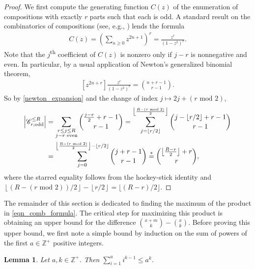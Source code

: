 \documentclass[11pt]{amsart}
\newtheorem{lemma}[theorem]{Lemma}
\newcommand{\ZZ}{\mathbb{Z}}
\begin{document}
\begin{proof}
    We first compute the generating function $C(z)$ of the enumeration of compositions with exactly $r$ parts such that each is odd. A standard result on the combinatorics of compositions (see, e.g., \cite[Theorem 2.1]{GF_of_restricted_comps}) lends the formula
    \begin{align*}
        C(z)=\left(\sum_{n\geq0}z^{2n+1}\right)^r=\frac{z^r}{\left(1-z^2\right)^r}.
    \end{align*}
    Note that the $j$\textsuperscript{th} coefficient of $C(z)$ is nonzero only if $j-r$ is nonnegative and even. In particular, by a usual application of Newton's generalized binomial theorem,
    \begin{align}\label{newton_expansion}
        [z^{2n+r}]\frac{z^r}{\left(1-z^2\right)^r}={n+r-1\choose r-1}.
    \end{align}
    So by \eqref{newton_expansion} and the change of index $j\mapsto 2j+(r\text{~mod~} 2)$,
    \begin{align*}
        \left|\mathscr{C}_{r,\text{\normalfont odd}}^{\leq R}\right|&=\sum_{\substack{r\leq j\leq R\\ j-r\text{~even}}}{\frac{j-r}{2}+r-1\choose r-1}=\sum_{j=\lfloor r/2\rfloor}^{\left\lfloor\frac{R-(r\text{~mod~}2)}{2}\right\rfloor}{j-\lfloor r/2\rfloor+r-1\choose r-1}\\
        &=\sum_{j=0}^{\left\lfloor\frac{R-(r\text{~mod~}2)}{2}\right\rfloor-\left\lfloor r/2\right\rfloor}{j+r-1\choose r-1}\stackrel{*}{=}{\left\lfloor\frac{R-r}{2}\right\rfloor+r\choose r},
    \end{align*}
    where the starred equality follows from the hockey-stick identity \cite{hockey_stick} and $\left\lfloor{(R-(r\text{~mod~}2))}/2\right\rfloor-\left\lfloor r/2\right\rfloor=\lfloor (R-r)/2\rfloor$.
\end{proof}

The remainder of this section is dedicated to finding the maximum of the product in \eqref{eqn_comb_formula}. The critical step for maximizing this product is obtaining an upper bound for the difference ${x+m\choose k}-{x\choose k}$. Before proving this upper bound, we first note a simple bound by induction on the sum of powers of the first $a\in\ZZ^+$ positive integers.

\begin{lemma}\label{faulhabers_rule_bound}
    Let $a,k\in\ZZ^+$. Then $\sum_{i=1}^{a}i^{k-1}\leq a^k$.
\end{lemma}
\end{document}

